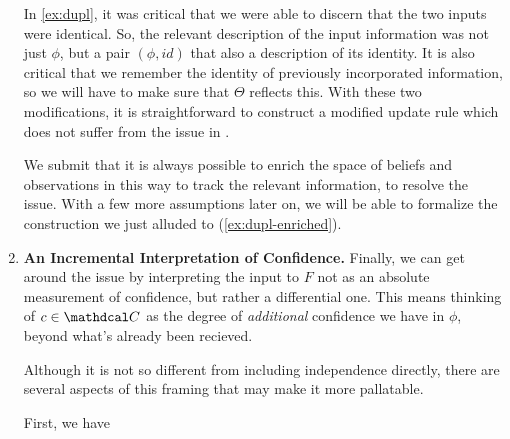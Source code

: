 \documentclass{article}
\def\confdom{\mathdcal C}
\begin{document}
\begin{enumerate}
    In \cref{ex:dupl}, it was critical that we were able to discern that the two inputs were identical.
    So, the relevant description of the input information was not just $\phi$, but a pair $(\phi, \mathit{id})$ that also a description of its identity.
    It is also critical that we remember the identity of previously incorporated information, so we will have to make sure that $\Theta$ reflects this.  
    With these two modifications, it is straightforward to construct a modified update rule which does not suffer from the issue in . 

    
    We submit that it is always possible to enrich the space of beliefs and observations in this way to track the relevant information, to resolve the issue.
    With a few more assumptions later on, we will be able to formalize the construction we just alluded to (\cref{ex:dupl-enriched}).

    \item \textbf{An Incremental Interpretation of Confidence.}
    Finally, we can get around the issue by interpreting the input to $F$ not as an absolute measurement of confidence, but rather a differential one. 
    This means thinking of $c \in \confdom$ as the degree of \emph{additional} confidence we have in $\phi$, beyond what's already been recieved. 
    
    Although it is not so different from including independence directly, there are several aspects of this framing that may make it more pallatable.
    
    First, we have  
    
\end{enumerate}


\end{document}
